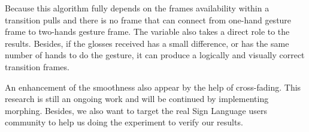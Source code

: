 \documentclass{sig-alternate-05-2015}
\begin{document}
Because this algorithm fully depends on the frames availability within a transition pulls and there is no frame that can connect from one-hand gesture frame to two-hands gesture frame. The variable also takes a direct role to the results. Besides, if the glosses received has a small difference, or has the same number of hands to do the gesture, it can produce a logically and visually correct transition frames. 

An enhancement of the smoothness also appear by the help of cross-fading. This research is still an ongoing work and will be continued by implementing morphing. Besides, we also want to target the real Sign Language users community to help us doing the experiment to verify our results.

%

%
%



\end{document}
